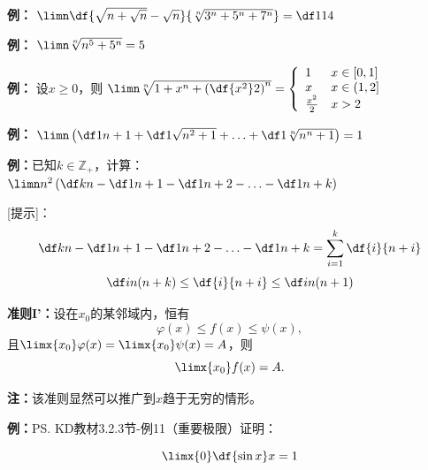 {\bf 例：} $\limn\df{\sqrt{n+\sqrt n}-\sqrt n}{\sqrt[n]{3^n+5^n+7^n}}=\df1{14}$


{\bf 例：} $\limn\sqrt[n]{n^5+5^n}=5$

{\bf 例：} 设$x\geq 0$，则
$\limn\sqrt[n]{1+x^n+\left(\df{x^2}2\right)^n}=
\left\{\begin{array}{ll}
1&x\in[0,1]\\ x & x\in(1,2]\\ \frac{x^2}2& x>2
\end{array}\right.$

{\bf 例：} $\limn\left(\df1{n+1}+\df1{\sqrt{n^2+1}}+\ldots
+\df1{\sqrt[n]{n^n+1}}\right)=1$

{\bf 例：}已知$k\in\mathbb{Z}_+$，计算：$\limn n^2\left(\df kn-\df1{n+1}-\df1{n+2}
-\ldots-\df1{n+k}\right)$

[提示]：
$$\df kn-\df1{n+1}-\df1{n+2}-\ldots-\df1{n+k}=\sum\limits_{i=1}^k\df{i}{n+i}$$
$$\df i{n(n+k)}\leq\df{i}{n+i}\leq\df i{n(n+1)}$$

\begin{thx}
	{\bf 准则I'：}设在$x_0$的某邻域内，恒有
	$$\varphi(x)\leq f(x)\leq\psi(x), $$
	且$\limx{x_0}\varphi(x)=\limx{x_0}\psi(x)=A$，则
	$$\limx{x_0}f(x)=A.$$
\end{thx}

{\bf 注：}该准则显然可以推广到$x$趋于无穷的情形。

{\bf 例：}\ps{KD教材3.2.3节-例11}（重要极限）证明：
\begin{thx}
	$$\limx{0}\df {\sin x}x=1$$
\end{thx}

